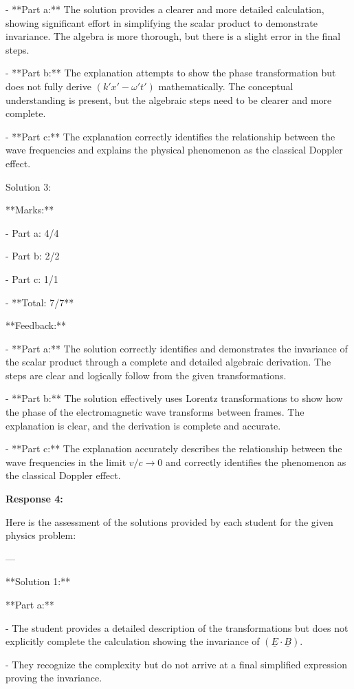 \documentclass[a4paper,11pt]{article}
\begin{document}
- **Part a:** The solution provides a clearer and more detailed calculation, showing significant effort in simplifying the scalar product to demonstrate invariance. The algebra is more thorough, but there is a slight error in the final steps.

- **Part b:** The explanation attempts to show the phase transformation but does not fully derive \( (k'x' - \omega' t') \) mathematically. The conceptual understanding is present, but the algebraic steps need to be clearer and more complete.

- **Part c:** The explanation correctly identifies the relationship between the wave frequencies and explains the physical phenomenon as the classical Doppler effect.

Solution 3:

**Marks:**

- Part a: 4/4

- Part b: 2/2

- Part c: 1/1

- **Total: 7/7**

**Feedback:**

- **Part a:** The solution correctly identifies and demonstrates the invariance of the scalar product through a complete and detailed algebraic derivation. The steps are clear and logically follow from the given transformations.

- **Part b:** The solution effectively uses Lorentz transformations to show how the phase of the electromagnetic wave transforms between frames. The explanation is clear, and the derivation is complete and accurate.

- **Part c:** The explanation accurately describes the relationship between the wave frequencies in the limit \( v/c \rightarrow 0 \) and correctly identifies the phenomenon as the classical Doppler effect.

\bigskip
\textbf{Response 4:}

Here is the assessment of the solutions provided by each student for the given physics problem:

---

**Solution 1:**

**Part a:**

- The student provides a detailed description of the transformations but does not explicitly complete the calculation showing the invariance of \((\underline{E} \cdot \underline{B})\).

- They recognize the complexity but do not arrive at a final simplified expression proving the invariance.
\end{document}
